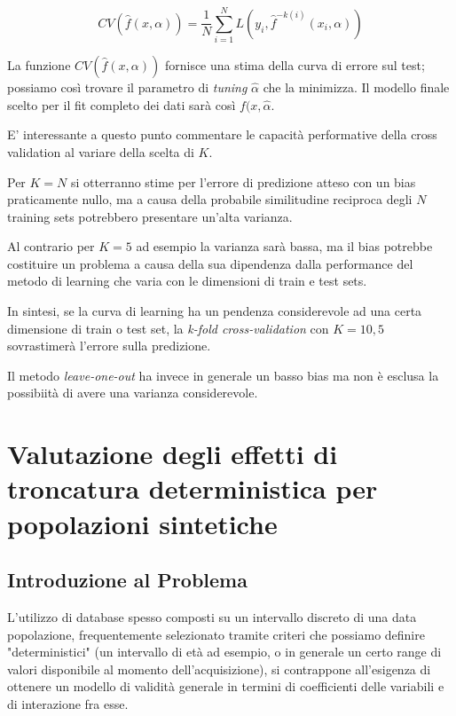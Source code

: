 \documentclass[a4paper]{report}
\begin{document}
\[
CV(\hat{f}(x,\alpha))=\frac{1}{N}\sum^{N}_{i=1}L(y_i,\hat{f}^{-k(i)}(x_i,\alpha))
\]

La funzione $CV(\hat{f}(x,\alpha))$ fornisce una stima della curva di errore sul test; possiamo così trovare il parametro di \textit{tuning} $\hat{\alpha}$ che la minimizza. Il modello finale scelto per il fit completo dei dati sarà così $f(x,\hat{\alpha}$.

E' interessante a questo punto commentare le capacità performative della cross validation al variare della scelta di $K$.

Per $K=N$ si otterranno stime per l'errore di predizione atteso con un bias praticamente nullo, ma a causa della probabile similitudine reciproca degli $N$ training sets potrebbero presentare un'alta varianza.

Al contrario per $K=5$ ad esempio la varianza sarà bassa, ma il bias potrebbe costituire un problema a causa della sua dipendenza dalla performance del metodo di learning che varia con le dimensioni di train e test sets.

In sintesi, se la curva di learning ha un pendenza considerevole ad una certa dimensione di train o test set, la \textit{k-fold cross-validation} con $K=10,5$ sovrastimerà l'errore sulla predizione.

Il metodo \textit{leave-one-out} ha invece in generale un basso bias ma non è esclusa la possibiità di avere una varianza considerevole.











  
  
  

  











 

\chapter{Valutazione degli effetti di troncatura deterministica per popolazioni sintetiche}

\section{Introduzione al Problema}
L'utilizzo di database spesso composti su un intervallo discreto di una data popolazione, frequentemente selezionato tramite criteri che possiamo definire "deterministici" (un intervallo di età ad esempio, o in generale un certo range di valori disponibile al momento dell'acquisizione), si contrappone all'esigenza di ottenere un modello di validità generale in termini di coefficienti delle variabili e di interazione fra esse.
\end{document}
